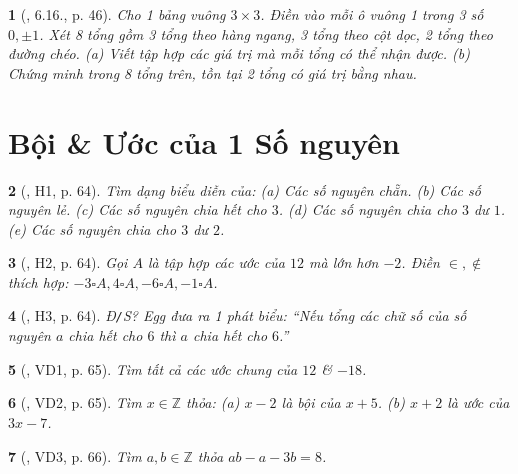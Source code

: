 \documentclass{article}
\newtheorem{baitoan}{}
\begin{document}
\begin{baitoan}[\cite{TLCT_THCS_Toan_6_so_hoc}, 6.16., p. 46]
	Cho 1 bảng vuông $3\times3$. Điền vào mỗi ô vuông 1 trong 3 số $0,\pm1$. Xét 8 tổng gồm 3 tổng theo hàng ngang, 3 tổng theo cột dọc, 2 tổng theo đường chéo. (a) Viết tập hợp các giá trị mà mỗi tổng có thể nhận được. (b) Chứng minh trong 8 tổng trên, tồn tại 2 tổng có giá trị bằng nhau.
\end{baitoan}


\section{Bội \& Ước của 1 Số nguyên}

\begin{baitoan}[\cite{Binh_boi_duong_Toan_6_tap_1}, H1, p. 64]
	Tìm dạng biểu diễn của: (a) Các số nguyên chẵn. (b) Các số nguyên lẻ. (c) Các số nguyên chia hết cho $3$. (d) Các số nguyên chia cho $3$ dư $1$. (e) Các số nguyên chia cho $3$ dư $2$.
\end{baitoan}

\begin{baitoan}[\cite{Binh_boi_duong_Toan_6_tap_1}, H2, p. 64]
	Gọi $A$ là tập hợp các ước của $12$ mà lớn hơn $-2$. Điền $\in,\notin$ thích hợp: $-3\square A,4\square A,-6\square A,-1\square A$.
\end{baitoan}

\begin{baitoan}[\cite{Binh_boi_duong_Toan_6_tap_1}, H3, p. 64]
	{\rm Đ{\tt/}S?} Egg đưa ra 1 phát biểu: ``Nếu tổng các chữ số của số nguyên $a$ chia hết cho $6$ thì $a$ chia hết cho $6$.''
\end{baitoan}

\begin{baitoan}[\cite{Binh_boi_duong_Toan_6_tap_1}, VD1, p. 65]
	Tìm tất cả các ước chung của $12$ \& $-18$.
\end{baitoan}

\begin{baitoan}[\cite{Binh_boi_duong_Toan_6_tap_1}, VD2, p. 65]
	Tìm $x\in\mathbb{Z}$ thỏa: (a) $x - 2$ là bội của $x + 5$. (b) $x + 2$ là ước của $3x - 7$.
\end{baitoan}

\begin{baitoan}[\cite{Binh_boi_duong_Toan_6_tap_1}, VD3, p. 66]
	Tìm $a,b\in\mathbb{Z}$ thỏa $ab - a - 3b = 8$.
\end{baitoan}
\end{document}
